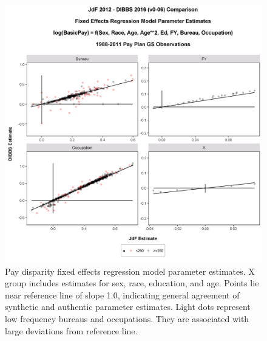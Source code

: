 \documentclass[10pt, letterpaper]{article}
\begin{document}
\begin{spacing}{1.0}
\clearpage

\begin{figure}[]
    \centering
    \includegraphics[width=6in, trim={0 0 0 1.5in}, clip]{DIBBSEstimateVsJdFEstimateNoInterceptGSPayPlanFixedRefLevel.png}
    \caption{Pay disparity fixed effects regression model parameter estimates.  X group includes estimates for sex, race, education, and age.  Points lie near reference line of slope 1.0, indicating general agreement of synthetic and authentic parameter estimates.  Light dots represent low frequency bureaus and occupations.  They are associated with large deviations from reference line.}
    \label{figure:DIBBSEstimateVsJdFEstimateNoInterceptGSPayPlanFixedRefLevel}
\end{figure}

\clearpage


\end{spacing}
\end{document}
